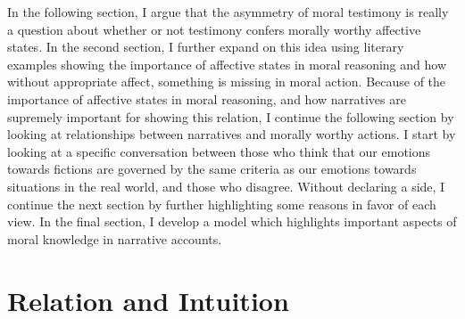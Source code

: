 \documentclass[
  12pt,
]{book}
\theoremstyle{definition}
\theoremstyle{definition}
\theoremstyle{definition}
\theoremstyle{definition}
\theoremstyle{remark}
\begin{document}
In the following section, I argue that the asymmetry of moral testimony is really a question about whether or not testimony confers morally worthy affective states. In the second section, I further expand on this idea using literary examples showing the importance of affective states in moral reasoning and how without appropriate affect, something is missing in moral action. Because of the importance of affective states in moral reasoning, and how narratives are supremely important for showing this relation, I continue the following section by looking at relationships between narratives and morally worthy actions. I start by looking at a specific conversation between those who think that our emotions towards fictions are governed by the same criteria as our emotions towards situations in the real world, and those who disagree. Without declaring a side, I continue the next section by further highlighting some reasons in favor of each view. In the final section, I develop a model which highlights important aspects of moral knowledge in narrative accounts.

\chapter{Relation and Intuition}\label{rel-int}
\end{document}
